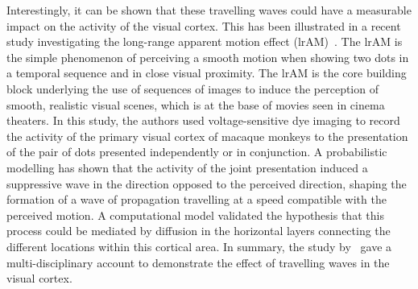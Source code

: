 \documentclass[brainsci, %
               review,submit,pdftex,moreauthors
               ]{Definitions/mdpi}
\begin{document}
Interestingly, it can be shown that these travelling waves could have a measurable impact on the activity of the visual cortex. This has been illustrated in a recent study investigating the long-range apparent motion effect (lrAM)~\citep{chemla_suppressive_2019}. The lrAM is the simple phenomenon of perceiving a smooth motion when showing two dots in a temporal sequence and in close visual proximity. The lrAM is the core building block underlying the use of sequences of images to induce the perception of smooth, realistic visual scenes, which is at the base of movies seen in cinema theaters. In this study, the authors used voltage-sensitive dye imaging to record the activity of the primary visual cortex of macaque monkeys to the presentation of the pair of dots presented independently or in conjunction. A probabilistic modelling has shown that the activity of the joint presentation induced a suppressive wave in the direction opposed to the perceived direction, shaping the formation of a wave of propagation travelling at a speed compatible with the perceived motion. A computational model validated the hypothesis that this process could be mediated by diffusion in the horizontal layers connecting the different locations within this cortical area. In summary, the study by~\citet{chemla_suppressive_2019} gave a multi-disciplinary account to demonstrate the effect of travelling waves in the visual cortex.
%
%
\end{document}
